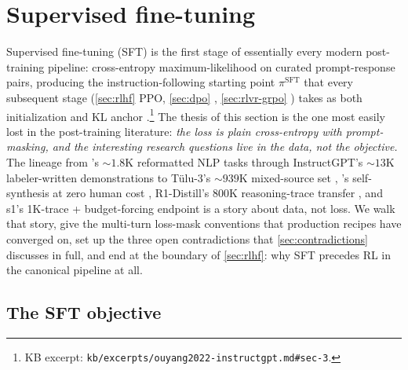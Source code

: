 
\section{Supervised fine-tuning}
\label{sec:sft}

Supervised fine-tuning (SFT) is the first stage of essentially every
modern post-training pipeline: cross-entropy maximum-likelihood on
curated prompt-response pairs, producing the instruction-following
starting point $\pi^{\mathrm{SFT}}$ that every subsequent stage
(\cref{sec:rlhf} PPO, \cref{sec:dpo} , \cref{sec:rlvr-grpo} )
takes as both initialization and KL anchor
\citep[\S 3]{ouyang2022-instructgpt}.\footnote{KB excerpt:
\nolinkurl{kb/excerpts/ouyang2022-instructgpt.md#sec-3}.} The thesis of
this section is the one most easily lost in the post-training
literature: \emph{the loss is plain cross-entropy with prompt-masking,
and the interesting research questions live in the data, not the
objective.} The lineage from 's $\sim\!1.8$K reformatted NLP tasks
\citep{wei2021-flan,chung2022-flan-t5} through InstructGPT's $\sim\!13$K
labeler-written demonstrations \citep[\S 3]{ouyang2022-instructgpt} to
T\"ulu-3's $\sim\!939$K mixed-source set \citep{tulu3}, 's
self-synthesis at zero human cost \citep{magpie-2024}, R1-Distill's
$800$K reasoning-trace transfer \citep[\S 4]{deepseek-r1}, and s1's
1K-trace + budget-forcing endpoint \citep{s1-2025} is a story about
data, not loss. We walk that story, give the multi-turn loss-mask
conventions that production recipes have converged on, set up the
three open contradictions that \cref{sec:contradictions} discusses in
full, and end at the boundary of \cref{sec:rlhf}: why SFT precedes RL
in the canonical pipeline at all.

\subsection{The SFT objective}
\label{sec:sft-objective}

